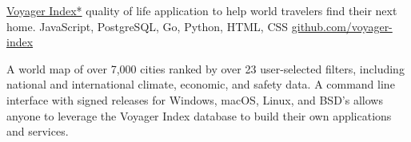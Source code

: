 \showoff
{\href{https://voyager-index.herokuapp.com}{Voyager Index*}}
{quality of life application to help world travelers find their next home.}
{JavaScript, PostgreSQL, Go, Python, HTML, CSS}
{\href{https://github.com/voyager-index/}{github.com/voyager-index}}

A world map of over 7,000 cities ranked by over 23 user-selected filters, including national and international climate,
economic, and safety data. A command line interface with signed releases for Windows, macOS, Linux, and BSD’s allows anyone to leverage the Voyager Index database to build their own applications and services.

\myBreak

